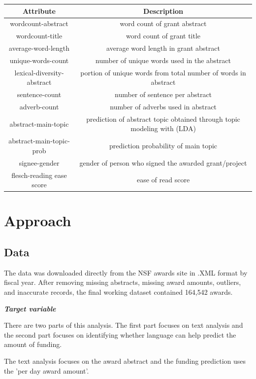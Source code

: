 \documentclass[11pt, oneside]{article}   	%
\begin{document}
\begin{center}
 \begin{tabular}{|c | c|} 
 \hline
 Attribute & Description\\
 \hline\hline
 wordcount-abstract & word count of grant abstract\\
 wordcount-title & word count of grant title\\
 average-word-length & average word length in grant abstract\\
 unique-words-count & number of unique words used in the abstract\\
 lexical-diversity-abstract & portion of unique words from total number of words in abstract\\
 sentence-count & number of sentence per abstract\\
 adverb-count & number of adverbs used in abstract\\
 abstract-main-topic & prediction of abstract topic obtained through topic modeling with (LDA)\\
 abstract-main-topic-prob & prediction probability of main topic\\
 signee-gender & gender of person who signed the awarded grant/project\\
 flesch-reading ease score & ease of read score\\
 \hline
\end{tabular}
\end{center}
 
 \section{Approach}
 
 \subsection{Data }
 
The data was downloaded directly from the NSF awards site in .XML format by fiscal year. After removing missing abstracts, missing award amounts, outliers, and inaccurate records, the final working dataset contained 164,542 awards.

 \textbf{\emph{Target variable} }

There are two parts of this analysis. The first part focuses on text analysis and the second part focuses on identifying  whether language can help predict the amount of funding.

The text analysis focuses on the award abstract and the funding prediction uses the 'per day award amount'.
\end{document}
